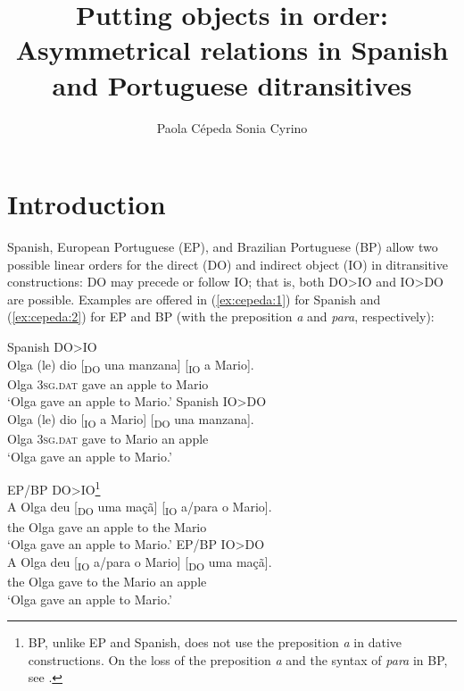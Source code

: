 \documentclass[output=paper,colorlinks,citecolor=brown,nonflat]{./langscibook}
\author{Paola Cépeda\affiliation{Stony Brook University}\lastand 
Sonia Cyrino\affiliation{University of Campinas}}
\title{Putting objects in order: Asymmetrical relations in Spanish and Portuguese ditransitives}
\begin{document}
\maketitle
{}

\section{Introduction}\label{sec:cepeda:1}

Spanish, European Portuguese (EP), and Brazilian Portuguese (BP) allow two possible linear orders for the direct (DO) and indirect object (IO) in ditransitive constructions: DO may precede or follow IO; that is, both DO>IO and IO>DO are possible. Examples are offered in (\ref{ex:cepeda:1}) for Spanish and (\ref{ex:cepeda:2}) for EP and BP (with the preposition \textit{a} and \textit{para}, respectively):

\ea%
    \label{ex:cepeda:1}
	\ea\label{ex:cepeda:1a}
	Spanish DO>IO\\
	\gll Olga (le) dio [\textsubscript{DO} una manzana] [\textsubscript{IO} a  Mario]. \\
		Olga \textsc{3sg.dat} gave \hspaceThis{[\textsubscript{DO}} an apple \hspaceThis{[\textsubscript{IO}} to Mario \\
	\glt ‘Olga gave an apple to Mario.'
	\ex\label{ex:cepeda:1b}Spanish IO>DO\\
		\gll Olga (le) dio [\textsubscript{IO} a  Mario] [\textsubscript{DO} una manzana]. \\
			Olga \textsc{3sg.dat} gave \hspaceThis{[\textsubscript{IO}} to Mario \hspaceThis{[\textsubscript{DO}} an   apple\\
		\glt ‘Olga gave an apple to Mario.’
	\z
\z

\ea%
    \label{ex:cepeda:2}
	\ea\label{ex:cepeda:2a}
	EP/BP DO>IO\footnote{BP, unlike EP and Spanish, does not use the preposition \textit{a} in dative constructions. On the loss of the preposition \textit{a} and the syntax of \textit{para} in BP, see .}\\
	\gll A Olga  deu [\textsubscript{DO} uma maçã] [\textsubscript{IO} a/para  o  Mario].\\
		the Olga gave  \hspaceThis{[\textsubscript{DO}} an   apple \hspaceThis{[\textsubscript{IO}} to the Mario \\
	\glt ‘Olga gave an apple to Mario.’
	\ex\label{ex:cepeda:2b}EP/BP IO>DO\\
	\gll A Olga  deu [\textsubscript{IO} a/para  o  Mario] [\textsubscript{DO} uma maçã]. \\
		the Olga gave \hspaceThis{[\textsubscript{IO}} to the Mario \hspaceThis{[\textsubscript{DO}} an apple \\
	\glt ‘Olga gave an apple to Mario.’
	\z
\z
\end{document}
